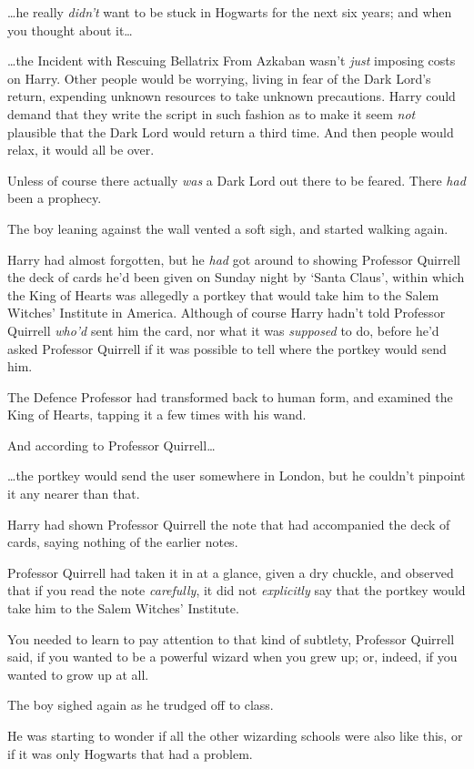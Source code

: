 …he really \emph{didn’t} want to be stuck in Hogwarts for the next six
years; and when you thought about it…

…the Incident with Rescuing Bellatrix From Azkaban wasn’t \emph{just}
imposing costs on Harry. Other people would be worrying, living in fear of the
Dark Lord’s return, expending unknown resources to take unknown precautions.
Harry could demand that they write the script in such fashion as to make it
seem \emph{not} plausible that the Dark Lord would return a third time. And
then people would relax, it would all be over.

Unless of course there actually \emph{was} a Dark Lord out there to be feared.
There \emph{had} been a prophecy.

The boy leaning against the wall vented a soft sigh, and started walking again.

Harry had almost forgotten, but he \emph{had} got around to showing
Professor Quirrell the deck of cards he’d been given on Sunday night by ‘Santa
Claus’, within which the King of Hearts was allegedly a portkey that would take
him to the Salem Witches’ Institute in America. Although of course Harry hadn’t
told Professor Quirrell \emph{who’d} sent him the card, nor what it was
\emph{supposed} to do, before he’d asked Professor Quirrell if it was possible
to tell where the portkey would send him.

The Defence Professor had transformed back to human form, and examined the King
of Hearts, tapping it a few times with his wand.

And according to Professor Quirrell…

…the portkey would send the user somewhere in London, but he couldn’t
pinpoint it any nearer than that.

Harry had shown Professor Quirrell the note that had accompanied the deck of
cards, saying nothing of the earlier notes.

Professor Quirrell had taken it in at a glance, given a dry chuckle, and
observed that if you read the note \emph{carefully}, it did not
\emph{explicitly} say that the portkey would take him to the Salem Witches’
Institute.

You needed to learn to pay attention to that kind of subtlety, Professor
Quirrell said, if you wanted to be a powerful wizard when you grew up; or,
indeed, if you wanted to grow up at all.

The boy sighed again as he trudged off to class.

He was starting to wonder if all the other wizarding schools were also like
this, or if it was only Hogwarts that had a problem.
